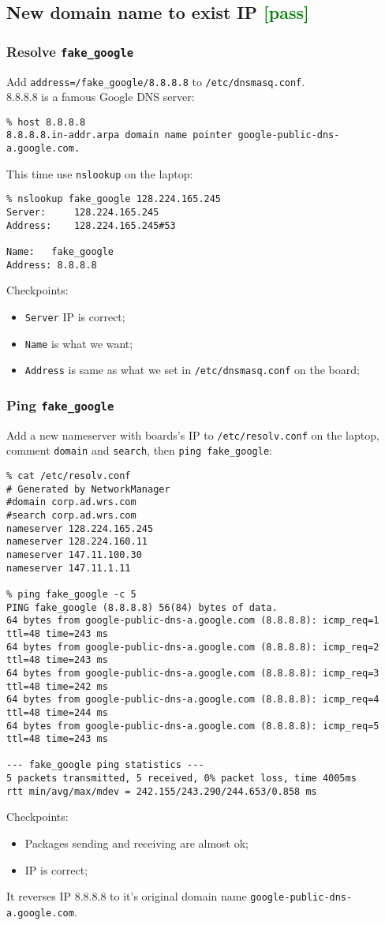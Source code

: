 \documentclass[a4paper]{report}
\begin{document}
\subsection{New domain name to exist IP \textcolor{green}{[pass]}}
\subsubsection{Resolve {\tt fake\_google}}
Add {\tt address=/fake\_google/8.8.8.8} to {\tt /etc/dnsmasq.conf}.\\
8.8.8.8 is a famous Google DNS server:
\begin{lstlisting}
% host 8.8.8.8                       
8.8.8.8.in-addr.arpa domain name pointer google-public-dns-a.google.com.
\end{lstlisting}
This time use {\tt nslookup} on the laptop:
\begin{lstlisting}
% nslookup fake_google 128.224.165.245
Server:		128.224.165.245
Address:	128.224.165.245#53

Name:	fake_google
Address: 8.8.8.8
\end{lstlisting}
Checkpoints:
\begin{itemize}
    \item {\tt Server} IP is correct;
    \item {\tt Name} is what we want;
    \item {\tt Address} is same as what we set in {\tt /etc/dnsmasq.conf} on the board;
\end{itemize}
\subsubsection{Ping {\tt fake\_google}}
Add a new nameserver with boards's IP to {\tt /etc/resolv.conf} on the laptop, comment
{\tt domain} and {\tt search}, then {\tt ping fake\_google}:
\begin{lstlisting}
% cat /etc/resolv.conf
# Generated by NetworkManager
#domain corp.ad.wrs.com
#search corp.ad.wrs.com
nameserver 128.224.165.245
nameserver 128.224.160.11
nameserver 147.11.100.30
nameserver 147.11.1.11

% ping fake_google -c 5
PING fake_google (8.8.8.8) 56(84) bytes of data.
64 bytes from google-public-dns-a.google.com (8.8.8.8): icmp_req=1 ttl=48 time=243 ms
64 bytes from google-public-dns-a.google.com (8.8.8.8): icmp_req=2 ttl=48 time=243 ms
64 bytes from google-public-dns-a.google.com (8.8.8.8): icmp_req=3 ttl=48 time=242 ms
64 bytes from google-public-dns-a.google.com (8.8.8.8): icmp_req=4 ttl=48 time=244 ms
64 bytes from google-public-dns-a.google.com (8.8.8.8): icmp_req=5 ttl=48 time=243 ms

--- fake_google ping statistics ---
5 packets transmitted, 5 received, 0% packet loss, time 4005ms
rtt min/avg/max/mdev = 242.155/243.290/244.653/0.858 ms
\end{lstlisting}
Checkpoints:
\begin{itemize}
    \item Packages sending and receiving are almost ok;
    \item IP is correct;
\end{itemize}
It reverses IP 8.8.8.8 to it's original domain name {\tt google-public-dns-a.google.com}.
\end{document}

